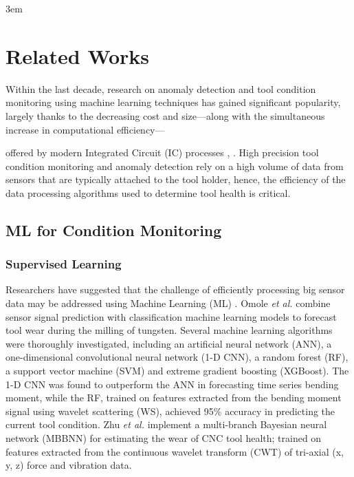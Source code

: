 \documentclass[../main.tex]{subfiles}
\begin{document}
\emergencystretch 3em

\section{Related Works}





Within the last decade, research on anomaly detection and tool condition monitoring using machine learning techniques has gained significant popularity, largely thanks to the decreasing cost and size---along 
with the simultaneous increase in computational efficiency---

offered by modern Integrated Circuit (IC) processes \cite{RN21}, \cite{RN22}. High precision tool condition monitoring and anomaly detection rely on a high volume of data from sensors that are typically attached to the tool holder, hence, the efficiency of the data processing algorithms used to determine tool health is critical. 

\subsection{ML for Condition Monitoring}
\subsubsection{Supervised Learning}

Researchers have suggested that the challenge of efficiently processing big sensor data may be addressed using Machine Learning (ML) \cite{RN23}. Omole \textit{et al.} \cite{RN18} combine sensor signal prediction with classification machine learning models to forecast tool wear during the milling of tungsten. Several machine learning algorithms were thoroughly investigated, including an artificial neural network (ANN), a one-dimensional convolutional neural network (1-D CNN), a random forest (RF), a support vector machine (SVM) and extreme gradient boosting (XGBoost). The 1-D CNN was found to outperform the ANN in forecasting time series bending moment, while the RF, trained on features extracted from the bending moment signal using wavelet scattering (WS), achieved 95\% accuracy in predicting the current tool condition. Zhu \textit{et al.} \cite{RN13} implement a multi-branch Bayesian neural network (MBBNN) for estimating the wear of CNC tool health; trained on features extracted from the continuous wavelet transform (CWT) of tri-axial (x, y, z) force and vibration data. 
\end{document}
